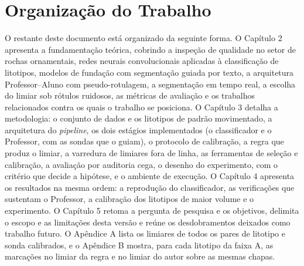 \section{Organização do Trabalho}

O restante deste documento está organizado da seguinte forma. O Capítulo 2 apresenta a fundamentação teórica, cobrindo a inspeção de qualidade no setor de rochas ornamentais, redes neurais convolucionais aplicadas à classificação de litotipos, modelos de fundação com segmentação guiada por texto, a arquitetura Professor--Aluno com pseudo-rotulagem, a segmentação em tempo real, a escolha do limiar sob rótulos ruidosos, as métricas de avaliação e os trabalhos relacionados contra os quais o trabalho se posiciona. O Capítulo 3 detalha a metodologia: o conjunto de dados e os litotipos de padrão movimentado, a arquitetura do \textit{pipeline}, os dois estágios implementados (o classificador e o Professor, com as sondas que o guiam), o protocolo de calibração, a regra que produz o limiar, a varredura de limiares fora de linha, as ferramentas de seleção e calibração, a avaliação por auditoria cega, o desenho do experimento, com o critério que decide a hipótese, e o ambiente de execução. O Capítulo 4 apresenta os resultados na mesma ordem: a reprodução do classificador, as verificações que sustentam o Professor, a calibração dos litotipos de maior volume e o experimento. O Capítulo 5 retoma a pergunta de pesquisa e os objetivos, delimita o escopo e as limitações desta versão e reúne os desdobramentos deixados como trabalho futuro. O Apêndice A lista os limiares de todos os pares de litotipo e sonda calibrados, e o Apêndice B mostra, para cada litotipo da faixa A, as marcações no limiar da regra e no limiar do autor sobre as mesmas chapas.
